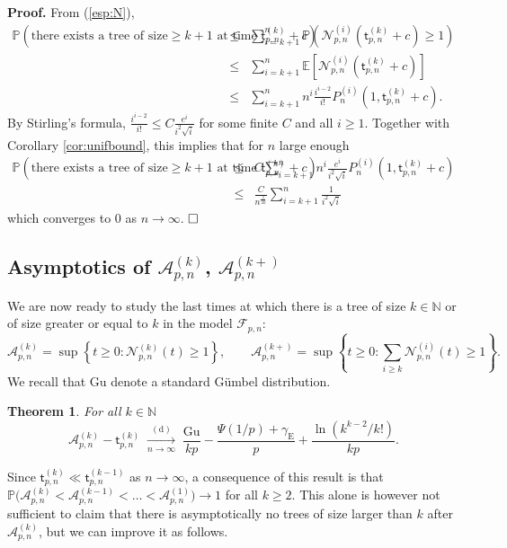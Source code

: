 \documentclass[a4, 11pt]{article}
\numberwithin{equation}{section}
\theoremstyle{plain}
\newtheorem{theorem}{Theorem}[section]
\theoremstyle{definition}
\theoremstyle{remark}
\begin{document}
\textbf{Proof.}
From (\ref{esp:N}),
\begin{eqnarray*}
\mathbb P\left(\text{there exists a tree of size}\geq k+1 \text{  at time } \mathsf t^{(k)}_{p,n} +c \right) &\leq& \sum_{i=k+1} ^n \mathbb P\left(\mathcal N_{p,n}^{(i)}(\mathsf t^{(k)}_{p,n}+c) \geq 1\right) \\
&\leq & \sum_{i=k+1}^n \mathbb E\left[\mathcal N_{p,n}^{(i)}(\mathsf t^{(k)}_{p,n}+c) \right] \\
&\leq& \sum_{i=k+1}^n n^i \frac{i^{i-2}}{i!} P_n^{(i)}(1,\mathsf t^{(k)}_{p,n}+c). 
\end{eqnarray*}
By Stirling's formula, $\frac{i^{i-2}}{i!} \leq C \frac{e^i}{i^2\sqrt i}$ for some finite $C$ and all $i\geq 1$. Together with Corollary \ref{cor:unifbound}, this implies that for $n$ large enough
\begin{eqnarray*}
\mathbb P\left(\text{there exists a tree of size}\geq k+1 \text{  at time } \mathsf t^{(k)}_{p,n} +c \right) 
&\leq& C\sum_{i=k+1}^n  n^i \frac{e^i}{i^2\sqrt i} P_n^{(i)}(1,\mathsf t^{(k)}_{p,n}+c) \\
&\leq & \frac{C}{n^{\frac{1}{2k}}} \sum_{i=k+1}^n  \frac{1}{i^2\sqrt i}
\end{eqnarray*}
which converges to 0 as $n \rightarrow \infty$.
$\hfill \square$


\subsection{Asymptotics of $\mathcal A_{p,n}^{(k)}$, $\mathcal A_{p,n}^{(k+)}$}
\label{sec:extinctiontimes}

We are now ready to study the last times at which there is a tree of size $k \in \mathbb N$ or of size greater or equal to $k$ in the model $\mathcal {F}_{p,n}$:
$$\mathcal A_{p,n}^{(k)}=\sup\left\{t\geq 0:\mathcal N_{p,n}^{(k)}(t) \geq 1\right\},\qquad
\mathcal A_{p,n}^{(k+)}=\sup\left\{t\geq 0:\sum_{i \geq k} \mathcal N_{p,n}^{(i)}(t) \geq 1 \right\}.$$
We recall that $\mathrm{Gu}$ denote a standard G\" umbel distribution. 

\begin{theorem}
\label{prop:tau_k_continu}
For all $k \in \mathbb N$
$$
\mathcal A_{p,n}^{(k)} - \mathsf t^{(k)}_{p,n}  \; \underset{n \rightarrow \infty}{\overset{(\mathrm d)}\longrightarrow} \; \frac{\mathrm{Gu}}{kp}-\frac{\Psi(1/p)+\gamma_{\mathrm E}}{p}+\frac{\ln (k^{k-2}/k!)}{kp}.
$$
\end{theorem}

Since $\mathsf t^{(k)}_{p,n} \ll \mathsf t_{p,n}^{(k-1)}$ as $n \rightarrow \infty$, a consequence of this result is that $\mathbb P\big(\mathcal A_{p,n}^{(k)}<\mathcal A_{p,n}^{(k-1)}<\ldots<\mathcal A_{p,n}^{(1)}\big)\rightarrow 1$  for all $k \geq 2$. This alone is however not sufficient to claim that there is asymptotically no trees of size larger than $k$ after $\mathcal A_{p,n}^{(k)}$, but we can improve it as follows.
\end{document}
